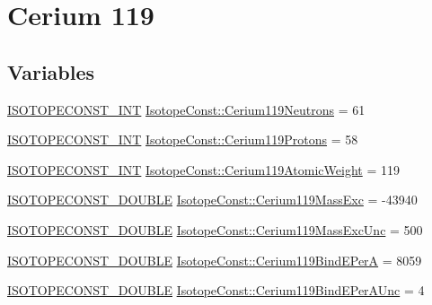 \hypertarget{group___isotope_const-_cerium-_ce119}{}\section{Cerium 119}
\label{group___isotope_const-_cerium-_ce119}
\subsection*{Variables}
\begin{DoxyCompactItemize}
\item 
\mbox{\hyperlink{group___isotope_const-_macros_ga5f18360b3e99483a35c32d789e62621c}{I\+S\+O\+T\+O\+P\+E\+C\+O\+N\+S\+T\+\_\+\+I\+NT}} \mbox{\hyperlink{group___isotope_const-_cerium-_ce119_gaa93fc532b0c6e2cd9dea63447b3b65de}{Isotope\+Const\+::\+Cerium119\+Neutrons}} = 61
\item 
\mbox{\hyperlink{group___isotope_const-_macros_ga5f18360b3e99483a35c32d789e62621c}{I\+S\+O\+T\+O\+P\+E\+C\+O\+N\+S\+T\+\_\+\+I\+NT}} \mbox{\hyperlink{group___isotope_const-_cerium-_ce119_gacaab63dfda2af49326920de210dbc219}{Isotope\+Const\+::\+Cerium119\+Protons}} = 58
\item 
\mbox{\hyperlink{group___isotope_const-_macros_ga5f18360b3e99483a35c32d789e62621c}{I\+S\+O\+T\+O\+P\+E\+C\+O\+N\+S\+T\+\_\+\+I\+NT}} \mbox{\hyperlink{group___isotope_const-_cerium-_ce119_gaf4895ef5f3fe8187e435c92707c36954}{Isotope\+Const\+::\+Cerium119\+Atomic\+Weight}} = 119
\item 
\mbox{\hyperlink{group___isotope_const-_macros_ga8f45a7272ce02c0b4c65c44636ed719a}{I\+S\+O\+T\+O\+P\+E\+C\+O\+N\+S\+T\+\_\+\+D\+O\+U\+B\+LE}} \mbox{\hyperlink{group___isotope_const-_cerium-_ce119_ga7904bd8f02a5cfb9bf08c1a69756ab82}{Isotope\+Const\+::\+Cerium119\+Mass\+Exc}} = -\/43940
\item 
\mbox{\hyperlink{group___isotope_const-_macros_ga8f45a7272ce02c0b4c65c44636ed719a}{I\+S\+O\+T\+O\+P\+E\+C\+O\+N\+S\+T\+\_\+\+D\+O\+U\+B\+LE}} \mbox{\hyperlink{group___isotope_const-_cerium-_ce119_ga25c0a0e6e7eee45eac4b60e88bef4b08}{Isotope\+Const\+::\+Cerium119\+Mass\+Exc\+Unc}} = 500
\item 
\mbox{\hyperlink{group___isotope_const-_macros_ga8f45a7272ce02c0b4c65c44636ed719a}{I\+S\+O\+T\+O\+P\+E\+C\+O\+N\+S\+T\+\_\+\+D\+O\+U\+B\+LE}} \mbox{\hyperlink{group___isotope_const-_cerium-_ce119_ga92e0414277aae7686a4b9419895cc1f6}{Isotope\+Const\+::\+Cerium119\+Bind\+E\+PerA}} = 8059
\item 
\mbox{\hyperlink{group___isotope_const-_macros_ga8f45a7272ce02c0b4c65c44636ed719a}{I\+S\+O\+T\+O\+P\+E\+C\+O\+N\+S\+T\+\_\+\+D\+O\+U\+B\+LE}} \mbox{\hyperlink{group___isotope_const-_cerium-_ce119_ga4d70bd0c3e0e120822bcda7c7e9e74bc}{Isotope\+Const\+::\+Cerium119\+Bind\+E\+Per\+A\+Unc}} = 4

\end{DoxyCompactItemize}
